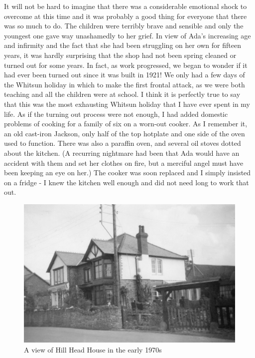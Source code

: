 It will not be hard to imagine that there was a considerable emotional shock to overcome at this time and it was probably a good thing for everyone that there was so much to do. The children were terribly brave and sensible and only the youngest one gave way unashamedly to her grief. In view of Ada's increasing age and infirmity and the fact that she had been struggling on her own for fifteen years, it was hardly surprising that the shop had not been spring cleaned or turned out for some years. In fact, as work progressed, we began to wonder if it had ever been turned out since it was built in 1921! We only had a few days of the Whitsun holiday in which to make the first frontal attack, as we were both teaching and all the children were at school. I think it is perfectly true to say that this was the most exhausting Whitsun holiday that I have ever spent in my life. As if the turning out process were not enough, I had added domestic problems of cooking for a family of six on a worn-out cooker. As I remember it, an old cast-iron Jackson, only half of the top hotplate and one side of the oven used to function. There was also a paraffin oven, and several oil stoves dotted about the kitchen. (A recurring nightmare had been that Ada would have an accident with them and set her clothes on fire, but a merciful angel must have been keeping an eye on her.) The cooker was soon replaced and I simply insisted on a fridge - I knew the kitchen well enough and did not need long to work that out.


\begin{figure}[]
     \includegraphics[width=1\textwidth]{figures/HillHeadHouse1960}
     \caption{A view of Hill Head House in the early 1970s}
     \label{fig:HHH1960}
\end{figure}

